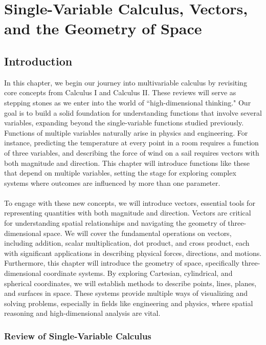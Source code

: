 \chapter{Single-Variable Calculus, Vectors, and the Geometry of Space}

\section*{Introduction}

In this chapter, we begin our journey into multivariable calculus by revisiting core concepts from Calculus I and Calculus II. These reviews will serve as stepping stones as we enter into the world of ``high-dimensional thinking." Our goal is to build a solid foundation for understanding functions that involve several variables, expanding beyond the single-variable functions studied previously. Functions of multiple variables naturally arise in physics and engineering. For instance, predicting the temperature at every point in a room requires a function of three variables, and describing the force of wind on a sail requires vectors with both magnitude and direction. This chapter will introduce functions like these that depend on multiple variables, setting the stage for exploring complex systems where outcomes are influenced by more than one parameter. \\ \\To engage with these new concepts, we will introduce vectors, essential tools for representing quantities with both magnitude and direction. Vectors are critical for understanding spatial relationships and navigating the geometry of three-dimensional space. We will cover the fundamental operations on vectors, including addition, scalar multiplication, dot product, and cross product, each with significant applications in describing physical forces, directions, and motions. Furthermore, this chapter will introduce the geometry of space, specifically three-dimensional coordinate systems. By exploring Cartesian, cylindrical, and spherical coordinates, we will establish methods to describe points, lines, planes, and surfaces in space. These systems provide multiple ways of visualizing and solving problems, especially in fields like engineering and physics, where spatial reasoning and high-dimensional analysis are vital.
\newpage





\subsection*{Review of Single-Variable Calculus}


